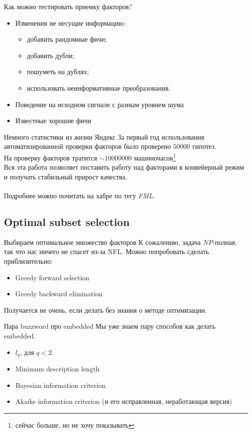 \documentclass[14pt, fleqn, xcolor={dvipsnames, table}]{beamer}
\begin{document}
\begin{frame}{Как можно тестировать приемку факторов?}
\begin{itemize}
  \item Изменения не несущие информацию:
  \begin{itemize}
    \item добавить рандомные фичи;
    \item добавить дубли;
    \item пошуметь на дублях;
    \item использовать неинформативные преобразования.
  \end{itemize}
  \item Поведение на исходном сигнале с разным уровнем шума
  \item Известные хорошие фичи
\end{itemize}
\end{frame}

\begin{frame}{Немного статистики из жизни {\color{red}Я}ндекс}
За первый год использования автоматизированной проверки факторов было проверено \textbf{$50 000$} гипотез. \\
На проверку факторов тратится \textbf{$\sim10 000 000$} машиночасов\footnote{сейчас больше, но не хочу показывать} \\
Вся эта работа позволяет поставить работу над факторами в конвейерный режим и получать стабильный прирост качества. \\
~\\
Подробнее можно почитать на хабре по тегу \textit{FML}.
\end{frame}

\subsection{Optimal subset selection}
\begin{frame}{Выбираем оптимальное множество факторов}
К сожалению, задача $NP$-полная, так что нас ничего не спасет из-за NFL. Можно попробовать сделать приблизительно:
\begin{itemize}
  \item Greedy forward selection
  \item Greedy backward elimination
\end{itemize}
Получается не очень, если делать без знания о методе оптимизации.
\end{frame}

\begin{frame}{Пара buzzword про embedded}
Мы уже знаем пару способов как делать embedded.
\begin{itemize}
  \item $l_q$, для $q < 2$.
  \item Minimum description length
  \item Bayesian information criterion
  \item Akaike information criterion (и его исправленная, неработающая версия)
\end{itemize}
\end{frame}
\end{document}
